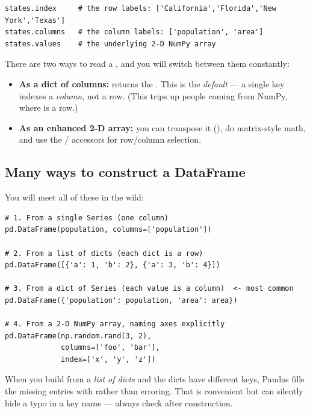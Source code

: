\documentclass[11pt]{article}
\begin{document}
\begin{lstlisting}
states.index     # the row labels: ['California','Florida','New York','Texas']
states.columns   # the column labels: ['population', 'area']
states.values    # the underlying 2-D NumPy array
\end{lstlisting}

\begin{intuition}
There are two ways to read a , and you will switch between them constantly:
\begin{itemize}
  \item \textbf{As a dict of columns:}  returns the  . This is the \emph{default} --- a single key indexes a \emph{column}, not a row. (This trips up people coming from NumPy, where  is a row.)
  \item \textbf{As an enhanced 2-D array:} you can transpose it (), do matrix-style math, and use the / accessors for row/column selection.
\end{itemize}
\end{intuition}

\subsection{Many ways to construct a DataFrame}

You will meet all of these in the wild:

\begin{lstlisting}
# 1. From a single Series (one column)
pd.DataFrame(population, columns=['population'])

# 2. From a list of dicts (each dict is a row)
pd.DataFrame([{'a': 1, 'b': 2}, {'a': 3, 'b': 4}])

# 3. From a dict of Series (each value is a column)  <- most common
pd.DataFrame({'population': population, 'area': area})

# 4. From a 2-D NumPy array, naming axes explicitly
pd.DataFrame(np.random.rand(3, 2),
             columns=['foo', 'bar'],
             index=['x', 'y', 'z'])
\end{lstlisting}

\begin{pitfall}
When you build from a \emph{list of dicts} and the dicts have different keys, Pandas fills the missing entries with  rather than erroring. That is convenient but can silently hide a typo in a key name --- always check  after construction.
\end{pitfall}
\end{document}
